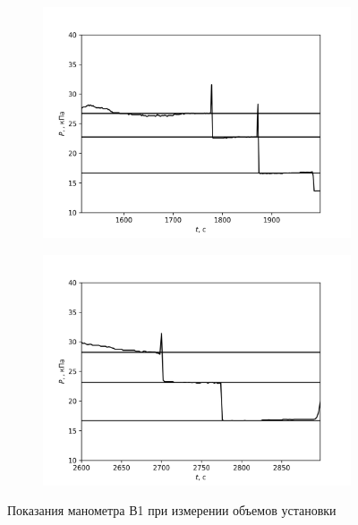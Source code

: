 \documentclass[14pt, a4paper]{report}
\begin{document}
\begin{figure}
	\centering
	\begin{subfigure}{.5\textwidth}
		\centering
		\includegraphics[width=\linewidth]{terma5_2.png}
	\end{subfigure}%
	\begin{subfigure}{.5\textwidth}
		\centering
		\includegraphics[width=\linewidth]{terma5_3.png}
	\end{subfigure}
	\caption{Показания манометра В1 при измерении объемов установки}
\end{figure}
\end{document}
